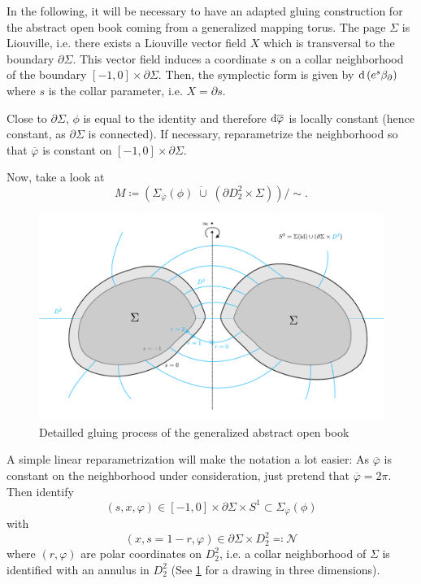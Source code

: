 In the following, it will be necessary to have an adapted gluing construction for the abstract open book coming from a generalized mapping torus.
The page $\Sigma$ is Liouville, i.e. there exists a Liouville vector field $X$ which is transversal to the boundary $\partial \Sigma$.
This vector field induces a coordinate $s$ on a collar neighborhood of the boundary $[-1,0] \times \partial \Sigma$.
Then, the symplectic form is given by $\mathrm{d} \left(e^s\beta_\partial\right)$ where $s$ is the collar parameter, i.e. $X = \partial s$.

Close to $\partial \Sigma$, $\phi$ is equal to the identity and therefore $\mathrm{d} \overline{\varphi}$ is locally constant (hence constant, as $\partial \Sigma$ is connected).
If necessary, reparametrize the neighborhood so that $\overline{\varphi}$ is constant on $[-1,0]\times \partial \Sigma$.

Now, take a look at
\[
    M \coloneqq \left(\Sigma_{\overline{\varphi}}(\phi)\; \dot\cup\; \left(\partial D_2^2 \times \Sigma\right)\right)/\sim.
\]
\begin{figure}
    \includegraphics[width=\textwidth]{../images/abstract_open_book_gluing.pdf}
    \caption[Gluing an abstract open book]{Detailled gluing process of the generalized abstract open book}
    \label{fig:abstract_open_book_gluing}
\end{figure}

A simple linear reparametrization will make the notation a lot easier: As $\overline{\varphi}$ is constant on the neighborhood under consideration, just pretend that $\overline{\varphi} = 2\pi$.
Then identify 
\[
    (s, x, \varphi) \in [-1,0] \times \partial \Sigma \times S^1 \subset \Sigma_{\overline{\varphi}}(\phi)
\]
with
\[
    (x, s = 1-r, \varphi) \in \partial \Sigma \times D_2^2 \eqqcolon \mathcal{N}
\]
where $(r, \varphi)$ are polar coordinates on $D_2^2$, i.e. a collar neighborhood of $\Sigma$ is identified with an annulus in $D_2^2$
(See \cref{fig:abstract_open_book_gluing} for a drawing in three dimensions).

